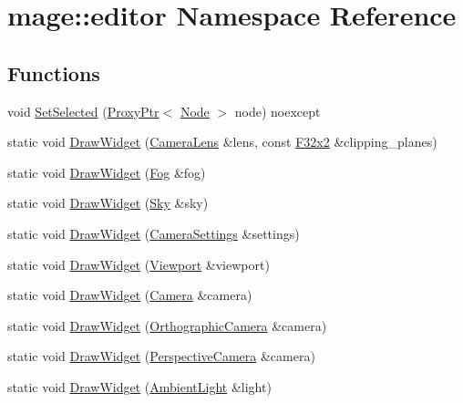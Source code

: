 \hypertarget{namespacemage_1_1editor}{}\section{mage\+:\+:editor Namespace Reference}
\label{namespacemage_1_1editor}
\subsection*{Functions}
\begin{DoxyCompactItemize}
\item 
void \hyperlink{namespacemage_1_1editor_a1c7e3052c446f3acbe8a1bb2106aec7a}{Set\+Selected} (\hyperlink{classmage_1_1_proxy_ptr}{Proxy\+Ptr}$<$ \hyperlink{classmage_1_1_node}{Node} $>$ node) noexcept
\item 
static void \hyperlink{namespacemage_1_1editor_af483e3263db836fae49c4c4c059dd9c4}{Draw\+Widget} (\hyperlink{classmage_1_1_camera_lens}{Camera\+Lens} \&lens, const \hyperlink{namespacemage_aa87237ad091f5cd7da612b8523fc108f}{F32x2} \&clipping\+\_\+planes)
\item 
static void \hyperlink{namespacemage_1_1editor_a8c96f88aab056a8b0904817ac1fa2a9d}{Draw\+Widget} (\hyperlink{classmage_1_1_fog}{Fog} \&fog)
\item 
static void \hyperlink{namespacemage_1_1editor_aeb0dbc0b7110bc339319058efb474acb}{Draw\+Widget} (\hyperlink{classmage_1_1_sky}{Sky} \&sky)
\item 
static void \hyperlink{namespacemage_1_1editor_a462a40b06ba74c058462c4afd3927dcc}{Draw\+Widget} (\hyperlink{classmage_1_1_camera_settings}{Camera\+Settings} \&settings)
\item 
static void \hyperlink{namespacemage_1_1editor_a7ecf1da7b0f7e65171180d25275ab743}{Draw\+Widget} (\hyperlink{classmage_1_1_viewport}{Viewport} \&viewport)
\item 
static void \hyperlink{namespacemage_1_1editor_a23fa7eda8c2527b241ca0b7f3fc08cad}{Draw\+Widget} (\hyperlink{classmage_1_1_camera}{Camera} \&camera)
\item 
static void \hyperlink{namespacemage_1_1editor_a4f5e9b46a25b009d2a4c83d0fbb1eab3}{Draw\+Widget} (\hyperlink{classmage_1_1_orthographic_camera}{Orthographic\+Camera} \&camera)
\item 
static void \hyperlink{namespacemage_1_1editor_a55d3a481381910efc4ce3ac28fa09c5f}{Draw\+Widget} (\hyperlink{classmage_1_1_perspective_camera}{Perspective\+Camera} \&camera)
\item 
static void \hyperlink{namespacemage_1_1editor_a6d7178801c17a609952f0c75389c4b92}{Draw\+Widget} (\hyperlink{classmage_1_1_ambient_light}{Ambient\+Light} \&light)

\end{DoxyCompactItemize}
